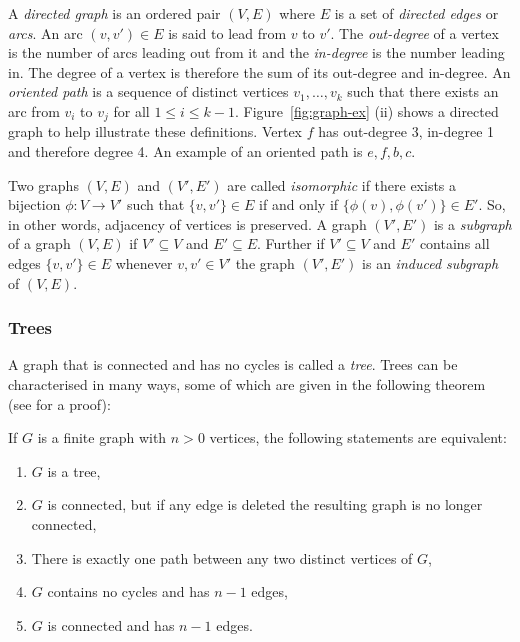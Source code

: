A \textit{directed graph} is an ordered pair $(V,E)$ where $E$ is a set of
\textit{directed edges} or \textit{arcs}.  An arc $(v,v') \in E$ is said to
lead from $v$ to $v'$.  The \textit{out-degree} of a vertex is the number of
arcs leading out from it and the \textit{in-degree} is the number leading in.
The degree of a vertex is therefore the sum of its out-degree and in-degree.
An \textit{oriented path} is a sequence of distinct vertices $v_1,\dotsc,v_k$
such that there exists an arc from $v_i$ to $v_j$ for all $1 \leq i \leq k-1$.
Figure~\ref{fig:graph-ex} (ii) shows a directed graph to help illustrate these
definitions.  Vertex $f$ has out-degree 3, in-degree 1 and therefore degree 4.
An example of an oriented path is $e,f,b,c$.

Two graphs $(V,E)$ and $(V',E')$ are called \textit{isomorphic} if there
exists a bijection $\phi \colon V \to V'$ such that $\{v,v'\} \in E$ if and
only if $\{\phi(v),\phi(v')\} \in E'$.  So, in other words, adjacency of
vertices is preserved.  A graph $(V',E')$ is a \textit{subgraph} of a graph
$(V,E)$ if $V' \subseteq V$ and $E' \subseteq E$.  Further if $V' \subseteq V$
and $E'$ contains all edges $\{v,v'\} \in E$ whenever $v,v' \in V'$ the graph
$(V',E')$ is an \textit{induced subgraph} of $(V,E)$.

\subsubsection{Trees}
\label{sec:trees}

A graph that is connected and has no cycles is called a \textit{tree}.  Trees can be
characterised in many ways, some of which are given in the following theorem
(see \citep[][Section 2.3.4.1]{knuth97taocp1} for a proof):

\begin{thm}
  If $G$ is a finite graph with $n > 0$ vertices, the following statements are
  equivalent:
  \begin{enumerate}[label=\alph*)]
  \item $G$ is a tree,
  \item $G$ is connected, but if any edge is deleted the resulting graph is no
    longer connected,
  \item There is exactly one path between any two distinct vertices of $G$,
  \item $G$ contains no cycles and has $n-1$ edges,
  \item $G$ is connected and has $n-1$ edges.
  \end{enumerate}
\end{thm}

